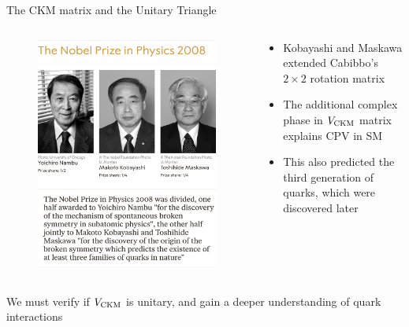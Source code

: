 \documentclass[dvipsnames]{beamer}
\begin{document}
\begin{frame}{The CKM matrix and the Unitary Triangle}
  \begin{columns}
    \begin{column}{0.4\textwidth}
      \begin{figure}
        \includegraphics[width=1.0\textwidth]{Plots/NobelPrizePhysics2008.png}
      \end{figure}
    \end{column}
    \begin{column}{0.6\textwidth}
      \begin{itemize}
        \setlength\itemsep{1.0em}
        \item{Kobayashi and Maskawa extended Cabibbo's $2\times2$ rotation matrix}
        \item{The additional complex phase in $V_{\rm CKM}$ matrix explains CPV in SM}
        \item{This also predicted the third generation of quarks, which were discovered later}
      \end{itemize}
    \end{column}
  \end{columns}
  \begin{center}
    \large We must verify if $V_{\rm CKM}$ is unitary, and gain a deeper understanding of quark interactions
  \end{center}
\end{frame}
\end{document}
